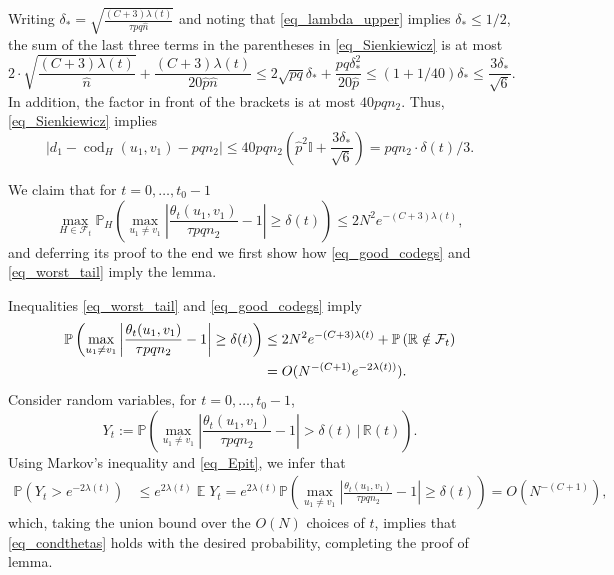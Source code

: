 \documentclass[12pt,reqno]{amsart}
\newcommand{\E}{\operatorname{\mathbb{E}}}
\newcommand{\fc}{{\mathcal{F}}}
\newcommand{\Prob} {\mathbb {P}}
\newcommand{\prob}[1]{\Prob\left(#1\right)}
\newcommand{\probH}[1]{\Prob_H\left(#1\right)}
\newcommand{\Pc}[2]{\prob{#1\,|\,#2}}
\newcommand{\R} {\mathbb R}
\newcommand{\I} {\mathbb I}
\newcommand{\cod}{\operatorname{cod}}
\theoremstyle{definition}
\newcommand{\deltat}{\delta(t)}
\begin{document}
Writing $\delta_* = \sqrt{\frac{(C+3)\lambda(t)}{\tau p q \hat n}}$ and noting that \eqref{eq_lambda_upper} implies $\delta_* \le 1/2$, the sum of the last three terms in the parentheses in \eqref{eq_Sienkiewicz} is at most
\begin{equation*}
  2 \cdot \sqrt{\frac{(C+3)\lambda(t)}{\hat n}} + \frac{(C+3)\lambda(t)}{20\hat p \hat n} {\le} 2\sqrt{pq}\delta_* + \frac{pq\delta_*^2}{20\hat p}   {\le}  (1 + 1/40) \delta_*\le  \frac{3\delta_*}{\sqrt{6}}.
\end{equation*}
In addition, the factor in front of the brackets is at most $40pq n_2$. Thus, \eqref{eq_Sienkiewicz} implies
\begin{equation}
  \label{eq_Tuwim}
  |d_1 - \cod_H(u_1, v_1) - pqn_2| \le 40 pqn_2  \left( \hat p^2 \I + \frac{3\delta_*}{\sqrt{6}} \right) = pqn_2 \cdot \deltat/3.
\end{equation}
	
We claim that for $t  = 0, \dots, t_0 - 1$
\begin{equation}
  \label{eq_worst_tail}
		\max_{H \in \fc_t}\probH{\max_{u_1 \ne v_1} \left|\frac{\theta_t(u_1,v_1)}{\tau pqn_2 } - 1\right| \ge \deltat} \le 2N^2e^{-(C+3)\lambda(t)},
	\end{equation}
	and deferring its proof to the end we first show how \eqref{eq_good_codegs} and \eqref{eq_worst_tail} imply the lemma.

Inequalities \eqref{eq_worst_tail} and \eqref{eq_good_codegs} imply
\begin{align}
\label{eq_Epit}
	\notag \prob{\max_{u_1 \ne v_1} \left|\frac{\theta_t(u_1,v_1)}{\tau pqn_2 } - 1\right| \ge \deltat} &\le 2N^2e^{-(C+3)\lambda(t)} + \prob{\R \notin \fc_t} \\
      &= O(N^{-(C+1)}e^{-2\lambda(t))}).
\end{align}
Consider random variables, for $t = 0, \dots, t_0 - 1$,
	\[
		Y_t := \Pc{\max_{u_1 \ne v_1} \left|\frac{\theta_t(u_1,v_1)}{\tau pqn_2 } - 1\right| > \deltat}{\R(t)}.
	\]
	Using Markov's inequality and \eqref{eq_Epit},
   we infer that
	\begin{align*}
	  \prob{Y_t > e^{-2\lambda(t)}} &\le e^{2\lambda(t)}\E Y_t = e^{2\lambda(t)}\prob{\max_{u_1 \ne v_1} \left|\frac{\theta_t(u_1,v_1)}{\tau pqn_2 } - 1\right| \ge \deltat} = O( N^{-(C+1)}),
	\end{align*}
	which, taking the union bound over the $O(N)$ choices of $t$, implies that \eqref{eq_condthetas} holds with the desired probability, completing the proof of lemma.
\end{document}
